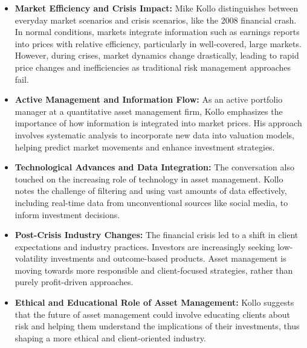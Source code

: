 \begin{itemize}
    \item \textbf{Market Efficiency and Crisis Impact:} Mike Kollo distinguishes between everyday market scenarios and crisis scenarios, like the 2008 financial crash. In normal conditions, markets integrate information such as earnings reports into prices with relative efficiency, particularly in well-covered, large markets. However, during crises, market dynamics change drastically, leading to rapid price changes and inefficiencies as traditional risk management approaches fail.
    
    \item \textbf{Active Management and Information Flow:} As an active portfolio manager at a quantitative asset management firm, Kollo emphasizes the importance of how information is integrated into market prices. His approach involves systematic analysis to incorporate new data into valuation models, helping predict market movements and enhance investment strategies.
    
    \item \textbf{Technological Advances and Data Integration:} The conversation also touched on the increasing role of technology in asset management. Kollo notes the challenge of filtering and using vast amounts of data effectively, including real-time data from unconventional sources like social media, to inform investment decisions.
    
    \item \textbf{Post-Crisis Industry Changes:} The financial crisis led to a shift in client expectations and industry practices. Investors are increasingly seeking low-volatility investments and outcome-based products. Asset management is moving towards more responsible and client-focused strategies, rather than purely profit-driven approaches.
    
    \item \textbf{Ethical and Educational Role of Asset Management:} Kollo suggests that the future of asset management could involve educating clients about risk and helping them understand the implications of their investments, thus shaping a more ethical and client-oriented industry.
\end{itemize}

